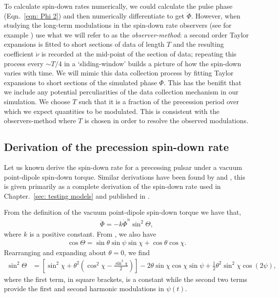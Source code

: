 \documentclass[../full_thesis/full_thesis.tex]{subfiles}
\begin{document}
To calculate spin-down rates numerically, we could calculate the pulse phase
(Eqn.~\eqref{eqn: Phi 2}) and then numerically differentiate to get
$\ddot{\Phi}$. However, when studying the long-term modulations in the spin-down
rate observers (see for example \citet{Lyne2010, Perera2015}) use what we will
refer to as the \emph{observer-method}: a second order Taylor expansions is
fitted to short sections of data of length $T$ and the resulting coefficient
$\ddot{\nu}$ is recorded at the mid-point of the section of data; repeating
this process every $\sim T/4$ in a `sliding-window' builds a picture of how the
spin-down varies with time.  We will mimic this data collection process by
fitting Taylor expansions to short sections of the simulated phase $\Phi$. This
has the benifit that we include any potential perculiarities of the data
collection mechanism in our simulation.  We choose $T$ such that it is a
fraction of the precession period over which we expect quantities to be
modulated. This is consistent with the observers-method where $T$ is chosen in
order to resolve the observed modulations.

\subsection{Derivation of the precession spin-down rate}
\label{sec: derivation of spin-down rate}
Let us known derive the spin-down rate for a precessing pulsar under a
vacuum point-dipole spin-down torque. Similar derivations have been found by
\citet{Link2001} and \citet{Jones2001}, this is given primarily as a complete
derivation of the spin-down rate used in Chapter.~\ref{sec: testing models}
and published in \citet{Ashton2016}.

From the definition of the vacuum point-dipole spin-down torque we have that,
\begin{align}
\ddot{\Phi} = -k \dot{\Phi}^{n} \sin^{2}\Theta,
\label{eqn: EM DE}
\end{align}
where $k$ is a positive constant. From \citet{Jones2001}, we also have
\begin{align}
\cos\Theta = \sin\theta \sin \psi \sin \chi + \cos\theta \cos\chi.
\end{align}
Rearranging and expanding about $\theta = 0$, we find
\begin{align}
\sin^{2}\Theta & =
\left[
\sin^{2}\chi + \theta^{2}\left(\cos^{2}\chi - \frac{\sin^{2}\chi}{2}\right)
\right]
- 2\theta \sin\chi\cos\chi \sin\psi
 + \frac{1}{2}\theta^{2}\sin^{2}\chi\cos(2\psi),
\label{eqn: sin 2 Theta}
\end{align}
where the first term, in square brackets, is a constant while the second two
terms provide the first and second harmonic modulations in $\psi(t)$.
\end{document}
